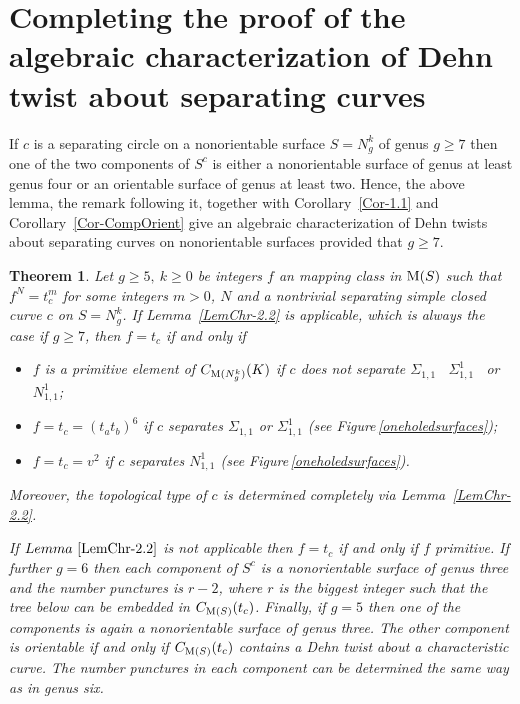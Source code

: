 \documentclass[11 pt]{amsart}
\newtheorem{Theorem}{Theorem}[section]
\theoremstyle{definition}
\begin{document}
\section{Completing the proof of the algebraic characterization of
Dehn twist about separating curves}

If $c$ is a separating circle on a nonorientable surface $S=N_g^k$
of genus $g\geq 7$ then one of the two components of $S^c$ is either
a nonorientable surface of genus at least genus four or an
orientable surface of genus at least two. Hence, the above lemma,
the remark following it, together with Corollary~\ref{Cor-1.1} and
Corollary~\ref{Cor-CompOrient} give an algebraic characterization of
Dehn twists about separating curves on nonorientable surfaces
provided that $g\geq 7$.

\begin{Theorem}\label{Chr-2.1} Let $g\geq 5, \ k\geq 0$ be integers $f$ an
mapping class in ${\rm M}(S)$ such that $f^N=t_c^m$ for some
integers $m>0$, $N$ and a nontrivial separating simple closed curve
$c$ on $S=N_g^k$. If Lemma~\ref{LemChr-2.2} is applicable, which is
always the case if $g\geq 7$, then $f=t_c$ if and only if
\begin{itemize}
\item[a)] $f$ is a primitive element of $C_{{\rm M}(N_{g}^{k})}(K)$ if $c$ does not separate
$\Sigma_{1,1}$ \ $\Sigma_{1,1}^1$ \ or $N_{1,1}^1$;
\item[b)] $f=t_c=(t_at_b)^6$ if $c$ separates
$\Sigma_{1,1}$ or $\Sigma_{1,1}^1$ (see
Figure\,\ref{oneholedsurfaces});
\item[c)] $f=t_c=v^2$ if $c$ separates
$N_{1,1}^1$ (see Figure\,\ref{oneholedsurfaces}).
\end{itemize}
Moreover, the topological type of $c$ is determined completely via
Lemma~\ref{LemChr-2.2}.

If $Lemma~\ref{LemChr-2.2}$ is not applicable then $f=t_c$ if and
only if $f$ primitive.  If further $g=6$ then each component of
$S^c$ is a nonorientable surface of genus three and the number
punctures is $r-2$, where $r$ is the biggest integer such that the
tree below can be embedded in $C_{{\rm M}(S)}(t_c)$. Finally, if
$g=5$ then one of the components is again a nonorientable surface of
genus three. The other component is orientable if and only if
$C_{{\rm M}(S)}(t_c)$ contains a Dehn twist about a characteristic
curve. The number punctures in each component can be determined the
same way as in genus six.
\end{Theorem}
\end{document}
